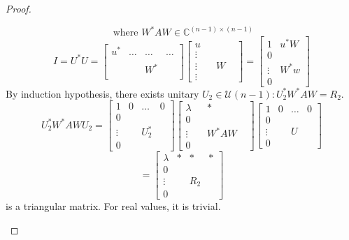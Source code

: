 \documentclass{article}
\numberwithin{lecref}{section}
\begin{document}
\begin{proof}
\begin{description}
      \[ \text{ where } W^* AW \in \mathbb C^{(n - 1) \times (n-1)} \]
      \[ I = U^* U = \begin{bmatrix} u^* & \dots & \dots & \dots \\ & & & \\ & & W^* & \\ & & & \end{bmatrix} \begin{bmatrix} u & & & \\ \vdots & & & \\ \vdots & & W & \\ \vdots & & & \end{bmatrix} = \begin{bmatrix} 1 & u^* W \\ 0 & \\ \vdots & W^* w \\ 0 & \end{bmatrix} \]
      By induction hypothesis, there exists unitary $U_2 \in \mathcal U(n-1): U_2^* W^* AW = R_2$.
      \[
        U_2^* W^* AW U_2 = 
        \begin{bmatrix}
          1 & 0 & \dots & 0 \\
          0 &    &      & \\
          \vdots & & U_2^* & \\
          0 &    &      &
        \end{bmatrix}
        \begin{bmatrix}
          \lambda & & * & \\
          0 &       &   & \\
          \vdots &  & W^* AW & \\
          0 &       &   &
        \end{bmatrix}
        \begin{bmatrix}
          1 & 0 & \dots & 0 \\
          0 &       &   & \\
          \vdots &  & U & \\
          0 &       &   &
        \end{bmatrix}
      \] \[
        = \begin{bmatrix}
          \lambda & * & *   & * \\
          0 &         &     & \\
          \vdots  &   & R_2 & \\
          0 &         &     &
        \end{bmatrix}
      \]
      is a triangular matrix. For real values, it is trivial.
  \end{description}
\end{proof}
\end{document}
